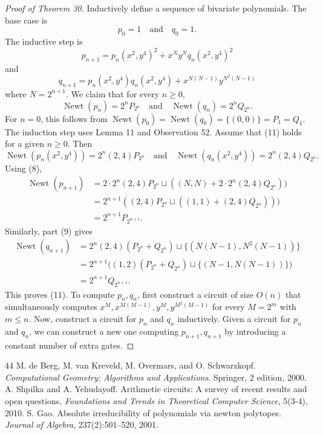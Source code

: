 \documentclass[10pt,a4paper]{article}
\newcommand{\Newt}{\operatorname{Newt}}
\begin{document}
\begin{proof}[Proof of Theorem 30]
Inductively define a sequence of bivariate polynomials. The base case is
\[p_0=1\quad\text{and}\quad q_0=1.\]
The inductive step is
\[p_{n+1}=p_n(x^2,y^4)^2+x^Ny^Nq_n(x^2,y^4)^2\]
and
\[q_{n+1}=p_n(x^2,y^4)q_n(x^2,y^4)+x^{N(N-1)}y^{N^2(N-1)}\]
where $N=2^{n+1}$.
We claim that for every $n\ge0$,
\begin{equation}
\Newt(p_n)=2^nP_{2^n}\quad\text{and}\quad\Newt(q_n)=2^nQ_{2^n}.\tag{11}
\end{equation}
For $n=0$, this follows from $\Newt(p_0)=\Newt(q_0)=\{(0,0)\}=P_1=Q_1$. The induction step uses Lemma 11 and Observation 52. Assume that (11) holds for a given $n\ge0$. Then
\[\Newt(p_n(x^2,y^4))=2^n(2,4)P_{2^n}\quad\text{and}\quad\Newt(q_n(x^2,y^4))=2^n(2,4)Q_{2^n}.\]
Using (8),
\begin{align*}
\Newt(p_{n+1})&=2\cdot2^n(2,4)P_{2^n}\sqcup((N,N)+2\cdot2^n(2,4)Q_{2^n}))\\
&=2^{n+1}((2,4)P_{2^n}\sqcup((1,1)+(2,4)Q_{2^n})))\\
&=2^{n+1}P_{2^{n+1}}.
\end{align*}
Similarly, part (9) gives
\begin{align*}
\Newt(q_{n+1})&=2^n(2,4)(P_{2^n}+Q_{2^n})\sqcup\{(N(N-1),N^2(N-1))\}\\
&=2^{n+1}\big((1,2)(P_{2^n}+Q_{2^n})\sqcup\{(N-1,N(N-1))\}\big)\\
&=2^{n+1}Q_{2^{n+1}}.
\end{align*}
This proves (11).
To compute $p_n,q_n$, first construct a circuit of size $O(n)$ that simultaneously computes $x^M,x^{M(M-1)},y^M,y^{M^2(M-1)}$ for every $M=2^m$ with $m\le n$. Now, construct a circuit for $p_n$ and $q_n$ inductively. Given a circuit for $p_n$ and $q_n$, we can construct a new one computing $p_{n+1},q_{n+1}$ by introducing a constant number of extra gates.
\end{proof}

\begin{thebibliography}{44}
 M. de Berg, M. van Kreveld, M. Overmars, and O. Schwarzkopf. \emph{Computational Geometry: Algorithms and Applications}. Springer, 2 edition, 2000.
 A. Shpilka and A. Yehudayoff. Arithmetic circuits: A survey of recent results and open questions. \emph{Foundations and Trends in Theoretical Computer Science}, 5(3-4), 2010.
 S. Gao. Absolute irreducibility of polynomials via newton polytopes. \emph{Journal of Algebra}, 237(2):501--520, 2001.
\end{thebibliography}
\end{document}
